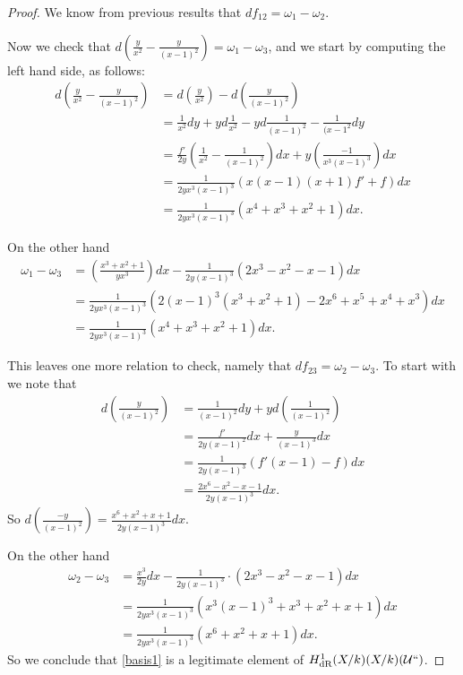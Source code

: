 \documentclass[draft, 11pt]{article} %
\theoremstyle{plain}
\theoremstyle{remark}
\newcommand{\cU}{{\mathcal U}}
\newcommand{\derhamhone}{H_{\text {dR}}^1(X/k)}
\begin{document}
\begin{proof}
We know from previous results that $df_{12} = \omega_ 1- \omega_2$.

Now we check that $d \left( \frac{y}{x^2} - \frac{y}{(x-1)^2} \right) = \omega_1 - \omega_3$, and we start by computing the left hand side, as follows:
\begin{align}
d \left( \frac{y}{x^2} - \frac{y}{(x-1)^2} \right) & = d \left( \frac{y}{x^2} \right) - d \left ( \frac{y}{(x-1)^2} \right) \\
& = \frac{1}{x^2}dy + y d\frac{1}{x^2} - yd\frac{1}{(x-1)^2} - \frac{1}{(x-1^2} dy \\
&  = \frac{f'}{2y} \left( \frac{1}{x^2} - \frac{1}{(x-1)^2} \right) dx + y \left( \frac{-1}{x^3(x-1)^3} \right)dx \\
& = \frac{1}{2yx^3(x-1)^3} (x(x-1)(x+1)f' +f) dx \\
& = \frac{1}{2yx^3(x-1)^3} (x^4+x^3+x^2+1)dx.
\end{align}

On the other hand
\begin{align}
\omega_1 - \omega_3 & = \left( \frac{x^3 + x^2 +1}{yx^3} \right)dx -  \frac{1}{2y(x-1)^3} (2x^3-x^2-x-1)dx \\
& = \frac{1}{2yx^3(x-1)^3} (2(x-1)^3(x^3+x^2+1) - 2x^6 +x^5 +x^4 + x^3)dx \\
& = \frac{1}{2yx^3(x-1)^3} ( x^4+x^3+x^2+1)dx.
\end{align}


This leaves one more relation to check, namely that $df_{23} = \omega_2 - \omega_3$.
To start with we note that 
\begin{align}
d\left( \frac{y}{(x-1)^2} \right) & = \frac{1}{(x-1)^2} dy + yd\left( \frac{1}{(x-1)^2} \right) \\
& = \frac{f'}{2y(x-1)^2}dx + \frac{y}{(x-1)^3}dx \\
& = \frac{1}{2y(x-1)^3} \left( f'(x-1) -f\right)dx \\
& = \frac{2x^6-x^2-x-1}{2y(x-1)^3}dx.
\end{align}
So $d\left( \frac{-y}{(x-1)^2} \right)  = \frac{x^6+x^2+x+1}{2y(x-1)^3}dx$.

On the other hand
\begin{align}
\omega_2 - \omega_3 & = \frac{x^3}{2y}dx - \frac{1}{2y(x-1)^3} \cdot (2x^3 - x^2 - x -1 )dx\\
& = \frac{1}{2yx^3(x-1)^3} \left( x^3(x-1)^3 +x^3+x^2+x+1 \right) dx \\
& = \frac{1}{2yx^3(x-1)^3}(x^6 +x^2+x+1)dx.
\end{align}
So we conclude that \eqref{basis1} is a legitimate element of $\derhamhone(X/k)(\cU``)$.


\end{proof}
\end{document}
